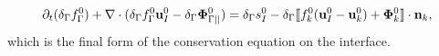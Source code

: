 \begin{equation}
    \partial_t (\delta_\Gamma f_\Gamma^0)  
    + \mathbf{\nabla}\cdot (
        \delta_\Gamma f_\Gamma^0 \textbf{u}_I^0
        - \delta_\Gamma \mathbf{\Phi}_{\Gamma||}^0 
        )
    = 
    \delta_\Gamma s_I^0
    - \delta_\Gamma\llbracket 
    f_k^0 (\textbf{u}_I^0 - \textbf{u}_k^0)
    + \mathbf{\Phi}_k^0 \rrbracket \cdot \textbf{n}_k,
\end{equation}
which is the final form of the conservation equation on the interface.


